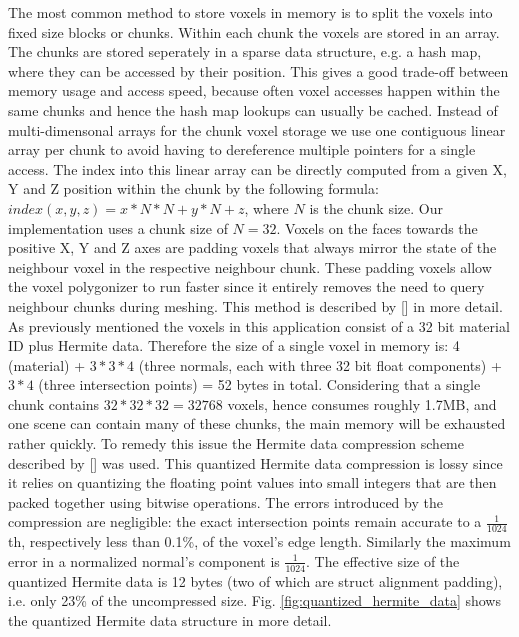 The most common method to store voxels in memory is to split the voxels into fixed size blocks or chunks. Within each chunk the voxels are stored in an array. The chunks are stored seperately in a sparse data structure, e.g. a hash map,
where they can be accessed by their position. This gives a good trade-off between memory usage and access speed, because often voxel accesses happen within the same chunks and hence the hash map lookups can usually be cached. Instead of multi-dimensonal arrays for the chunk voxel storage we use one contiguous linear array per chunk to avoid having to dereference multiple pointers for a single access. The index into this linear array can be directly computed from a given X, Y and Z position within the chunk by the following formula: $index(x, y, z) = x * N * N + y * N + z$, where $N$ is the chunk size.
Our implementation uses a chunk size of $N=32$. Voxels on the faces towards the positive X, Y and Z axes are padding voxels that always mirror the state of the neighbour voxel in the respective neighbour chunk.
These padding voxels allow the voxel polygonizer to run faster since it entirely removes the need to query neighbour chunks during meshing. This method is described by [] in more detail. \\
As previously mentioned the voxels in this application consist of a 32 bit material ID plus Hermite data. Therefore the size of a single voxel in memory is: 4 (material) + $3*3*4$ (three normals, each with three 32 bit float components) + $3*4$ (three intersection points) = 52 bytes in total. Considering that a single chunk contains $32 * 32 * 32 = 32768$ voxels, hence consumes roughly 1.7MB, and one scene can contain many of these chunks,
the main memory will be exhausted rather quickly.
To remedy this issue the Hermite data compression scheme described by [] was used.
This quantized Hermite data compression is lossy since it relies on quantizing the floating point values into small integers that are then packed together using bitwise operations. The errors introduced by the compression are
negligible: the exact intersection points remain accurate to a $\frac{1}{1024}$th, respectively less than 0.1\%, of the voxel's edge length. Similarly the maximum error in a normalized normal's component is $\frac{1}{1024}$.
The effective size of the quantized Hermite data is 12 bytes (two of which are struct alignment padding), i.e. only 23\% of the uncompressed size. Fig. \ref{fig:quantized_hermite_data} shows the quantized Hermite data
structure in more detail.\\

